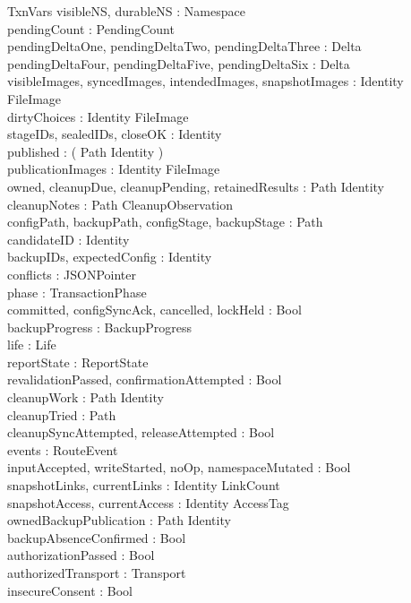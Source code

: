 \documentclass{article}
\begin{document}
\begin{schema}{TxnVars}
	visibleNS, durableNS : Namespace \\
	pendingCount : PendingCount \\
	pendingDeltaOne, pendingDeltaTwo, pendingDeltaThree : Delta \\
	pendingDeltaFour, pendingDeltaFive, pendingDeltaSix : Delta \\
	visibleImages, syncedImages, intendedImages, snapshotImages :
	Identity \pfun FileImage \\
	dirtyChoices : Identity \pfun \power FileImage \\
	stageIDs, sealedIDs, closeOK : \power Identity \\
	published : \power ( Path \cross Identity ) \\
	publicationImages : Identity \pfun FileImage \\
	owned, cleanupDue, cleanupPending, retainedResults : Path \pfun Identity \\
	cleanupNotes : Path \pfun CleanupObservation \\
	configPath, backupPath, configStage, backupStage : Path \\
	candidateID : Identity \\
	backupIDs, expectedConfig : \power Identity \\
	conflicts : \power JSONPointer \\
	phase : TransactionPhase \\
	committed, configSyncAck, cancelled, lockHeld : Bool \\
	backupProgress : BackupProgress \\
	life : Life \\
	reportState : ReportState \\
	revalidationPassed, confirmationAttempted : Bool \\
	cleanupWork : Path \pfun Identity \\
	cleanupTried : \power Path \\
	cleanupSyncAttempted, releaseAttempted : Bool \\
	events : \power RouteEvent \\
	inputAccepted, writeStarted, noOp, namespaceMutated : Bool \\
	snapshotLinks, currentLinks : Identity \pfun LinkCount \\
	snapshotAccess, currentAccess : Identity \pfun AccessTag \\
	ownedBackupPublication : Path \pfun Identity \\
	backupAbsenceConfirmed : Bool \\
	authorizationPassed : Bool \\
	authorizedTransport : \power Transport \\
	insecureConsent : Bool
\end{schema}
\end{document}
